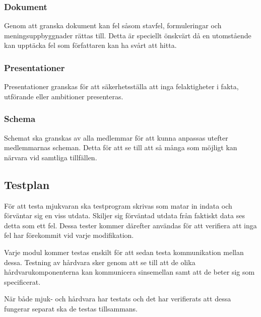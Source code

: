 \documentclass[projektplan/plan.tex]{subfiles}
\begin{document}
\subsubsection{Dokument}	
Genom att granska dokument kan fel såsom stavfel, formuleringar och
meningsuppbyggnader rättas till. Detta är speciellt önskvärt då en utomstående
kan upptäcka fel som författaren kan ha svårt att hitta.

\subsubsection{Presentationer}	
Presentationer granskas för att säkerhetsställa att inga felaktigheter i fakta,
utförande eller ambitioner presenteras.

\subsubsection{Schema}	
Schemat ska granskas av alla medlemmar för att kunna anpassas utefter
medlemmarnas scheman. Detta för att se till att så många som möjligt kan
närvara vid samtliga tillfällen. 

\subsection{Testplan}
För att testa mjukvaran ska testprogram skrivas som matar in indata och
förväntar sig en viss utdata. Skiljer sig förväntad utdata från faktiskt data
ses detta som ett fel. Dessa tester kommer därefter användas för att verifiera
att inga fel har förekommit vid varje modifikation.

Varje modul kommer testas enskilt för att sedan testa kommunikation mellan
dessa. Testning av hårdvara sker genom att se till att de olika
hårdvarukomponenterna kan kommunicera sinsemellan samt att de beter sig som
specificerat.

När både mjuk- och hårdvara har testats och det har verifierats att dessa
fungerar separat ska de testas tillsammans.
\end{document}
